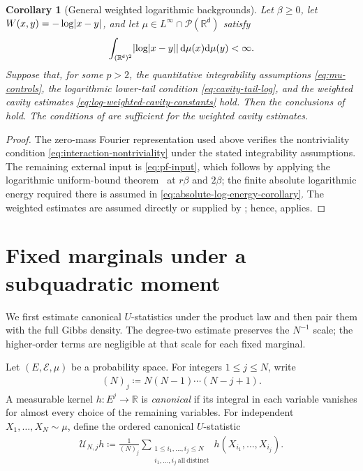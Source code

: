 \documentclass[11pt,reqno]{amsart}
\numberwithin{equation}{section}
\theoremstyle{plain}
\newtheorem{cor}[cor]{Corollary}
\theoremstyle{remark}
\DeclarePairedDelimiter{\abs}{\lvert}{\rvert}
\renewcommand{\d}{\mathsf{d}}
\newcommand{\md}{\mathrm{d}}
\newcommand{\R}{{\mathbb{R}}}
\newcommand{\be}{\beta}
\newcommand{\Pp}{\mathcal{P}}
\begin{document}
\begin{cor}[General weighted logarithmic backgrounds]\label{cor:intro-log-weighted}
Let \(\be\ge0\), let \(W(x,y)=-\log\abs{x-y}\), and let \(\mu\in L^\infty\cap\Pp(\R^\d)\) satisfy
\begin{align}\label{eq:absolute-log-energy-corollary}
 \int_{(\R^\d)^2}\abs{\log\abs{x-y}}\,\md\mu(x)\md\mu(y)<\infty.
\end{align}
Suppose that, for some \(p>2\), the quantitative integrability assumptions \eqref{eq:mu-controls}, the logarithmic lower-tail condition \eqref{eq:cavity-tail-log}, and the weighted cavity estimates \eqref{eq:log-weighted-cavity-constants} hold.  Then the conclusions of  hold.  The conditions of  are sufficient for the weighted cavity estimates.
\end{cor}

\begin{proof}
The zero-mass Fourier representation used above verifies the nontriviality condition \eqref{eq:interaction-nontriviality} under the stated integrability assumptions.  The remaining external input is \eqref{eq:pf-input}, which follows by applying the logarithmic uniform-bound theorem~\cite[Theorem~2.2\textup{(i)}]{DGR26} at \(r\be\) and \(2\be\); the finite absolute logarithmic energy required there is assumed in \eqref{eq:absolute-log-energy-corollary}.  The weighted estimates are assumed directly or supplied by ; hence,  applies.
\end{proof}

\section{Fixed marginals under a subquadratic moment}\label{sec:subquadratic-marginals}
\label{subsec:fixed-marginal-U-statistic-transfer}

We first estimate canonical $U$-statistics under the product law and then pair them with the full Gibbs density.  The degree-two estimate preserves the $N^{-1}$ scale; the higher-order terms are negligible at that scale for each fixed marginal.

Let \((E,\mathcal E,\mu)\) be a probability space.  For integers \(1\le j\le N\), write
\begin{align}\label{eq:falling-factorial-definition}
 (N)_j\coloneqq N(N-1)\cdots(N-j+1).
\end{align}
A measurable kernel \(h:E^j\to\R\) is \emph{canonical} if its integral in each variable vanishes for almost every choice of the remaining variables.  For independent \(X_1,\ldots,X_N\sim\mu\), define the ordered canonical \(U\)-statistic
\begin{align}\label{eq:ordered-canonical-U-statistic}
 \mathcal U_{N,j}h
 \coloneqq\frac1{(N)_j}
 \sum_{\substack{1\le i_1,\ldots,i_j\le N\\
 i_1,\ldots,i_j\ \mathrm{all\ distinct}}}
 h(X_{i_1},\ldots,X_{i_j}).
\end{align}
\end{document}
